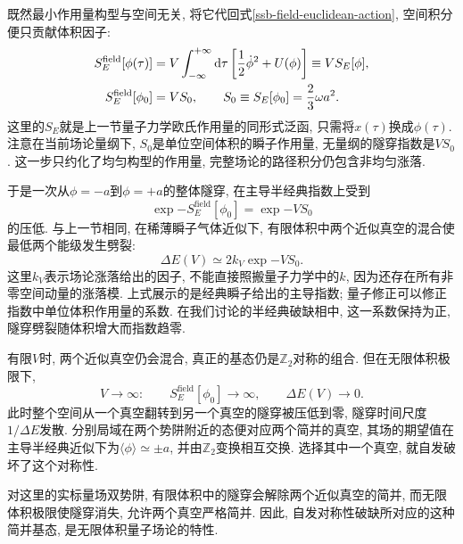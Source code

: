 既然最小作用量构型与空间无关, 将它代回式\eqref{ssb-field-euclidean-action}, 空间积分便只贡献体积因子:
\begin{align}\label{ssb-field-volume-factor}
    S_E^{\mathrm{field}}[\phi(\tau)]
    &=V\int_{-\infty}^{+\infty}\mathrm d\tau
      \left[\frac12\dot\phi^2+U(\phi)\right]
      \equiv V S_E[\phi],\notag\\
    S_E^{\mathrm{field}}[\phi_0]
    &=V S_0,\qquad S_0\equiv S_E[\phi_0]=\frac23\omega a^2.
\end{align}
这里的$S_E$就是上一节量子力学欧氏作用量的同形式泛函, 只需将$x(\tau)$换成$\phi(\tau)$. 注意在当前场论量纲下, $S_0$是单位空间体积的瞬子作用量, 无量纲的隧穿指数是$VS_0$. 这一步只约化了均匀构型的作用量, 完整场论的路径积分仍包含非均匀涨落.

于是一次从$\phi=-a$到$\phi=+a$的整体隧穿, 在主导半经典指数上受到
\begin{equation}
    \exp{-S_E^{\mathrm{field}}[\phi_0]}=\exp{-VS_0}
\end{equation}
的压低. 与上一节相同, 在稀薄瞬子气体近似下, 有限体积中两个近似真空的混合使最低两个能级发生劈裂:
\begin{equation}\label{ssb-field-energy-splitting}
    \Delta E(V)\simeq2k_V\exp{-VS_0}.
\end{equation}
这里$k_V$表示场论涨落给出的因子, 不能直接照搬量子力学中的$k$, 因为还存在所有非零空间动量的涨落模. 上式展示的是经典瞬子给出的主导指数; 量子修正可以修正指数中单位体积作用量的系数. 在我们讨论的半经典破缺相中, 这一系数保持为正, 隧穿劈裂随体积增大而指数趋零.

有限$V$时, 两个近似真空仍会混合, 真正的基态仍是$\mathbb Z_2$对称的组合. 但在无限体积极限下,
\begin{equation}
    V\to\infty:\qquad
    S_E^{\mathrm{field}}[\phi_0]\to\infty,\qquad
    \Delta E(V)\to0.
\end{equation}
此时整个空间从一个真空翻转到另一个真空的隧穿被压低到零, 隧穿时间尺度$1/\Delta E$发散. 分别局域在两个势阱附近的态便对应两个简并的真空, 其场的期望值在主导半经典近似下为$\langle\phi\rangle\simeq\pm a$, 并由$\mathbb Z_2$变换相互交换. 选择其中一个真空, 就自发破坏了这个对称性.

\begin{important}
    对这里的实标量场双势阱, 有限体积中的隧穿会解除两个近似真空的简并, 而无限体积极限使隧穿消失, 允许两个真空严格简并. 因此, 自发对称性破缺所对应的这种简并基态, 是无限体积量子场论的特性.
\end{important}
